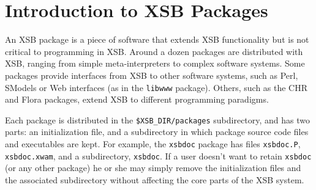 \chapter{Introduction to XSB Packages} \label{packages}

An XSB package is a piece of software that extends XSB functionality
but is not critical to programming in XSB.  Around a dozen packages
are distributed with XSB, ranging from simple meta-interpreters to
complex software systems.  Some packages provide interfaces from XSB
to other software systems, such as Perl, SModels or Web interfaces (as
in the {\tt libwww} package).  Others, such as the CHR and Flora packages,
extend XSB to different programming paradigms.

Each package is distributed in the {\tt \$XSB\_DIR/packages}
subdirectory, and has two parts: an initialization file, and a
subdirectory in which package source code files and executables are
kept.  For example, the {\tt xsbdoc} package has files {\tt xsbdoc.P},
{\tt xsbdoc.xwam}, and a subdirectory, {\tt xsbdoc}.  If a user
doesn't want to retain {\tt xsbdoc} (or any other package) he or she
may simply remove the initialization files and the associated
subdirectory without affecting the core parts of the XSB system.


